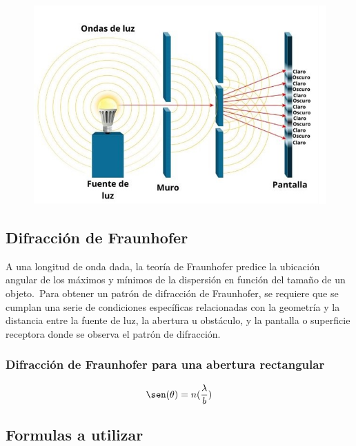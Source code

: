 \documentclass[twocolumn, 12pt]{article}
\begin{document}
\begin{figure}[H]
      \begin{center}
            \includegraphics[width=.9\linewidth]{./Images/6.png}
      \end{center}
      \caption{}
\end{figure}

\subsection{Difracción de Fraunhofer}

A una longitud de onda dada, la teoría de Fraunhofer
predice la ubicación angular de los máximos y mínimos de la
dispersión en función del tamaño de un
objeto.~\cite{fraunhofer}Para obtener un patrón de
difracción de Fraunhofer, se requiere que se cumplan una
serie de condiciones específicas relacionadas con la
geometría y la distancia entre la fuente de luz, la
abertura u obstáculo, y la pantalla o superficie receptora
donde se observa el patrón de difracción.

\subsubsection*{Difracción de Fraunhofer \hfill{} \break{} para una abertura rectangular}

\begin{equation*}
      \sen (\theta) = n(\frac{\lambda}{b})
\end{equation*}

\subsection*{Formulas a utilizar}
\end{document}
